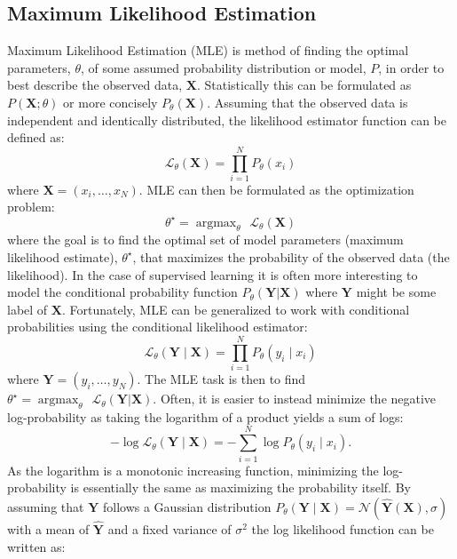 \documentclass[a4paper,11pt]{article} %
\DeclareMathOperator*{\argmax}{argmax} %
\begin{document}
\subsection{Maximum Likelihood Estimation}
Maximum Likelihood Estimation (MLE) is method of finding the optimal parameters, $\theta$, of some assumed probability distribution or model, $P$, in order to best describe the observed data, $\mathbf{X}$. Statistically this can be formulated as $P(\mathbf{X}; \theta)$ or more concisely $P_\theta(\mathbf{X})$. Assuming that the observed data is independent and identically distributed, the likelihood estimator function can be defined as:
\begin{equation}
  \mathcal{L}_\theta(\mathbf{X}) = \prod_{i=1}^{N}{P_\theta(x_i)}
\end{equation} 
where $\mathbf{X} = (x_i, \ldots, x_N)$. MLE can then be formulated as the optimization problem:
\begin{equation}
  \theta^\star = \argmax_{\theta} \hspace{5pt} \mathcal{L}_\theta(\mathbf{X})
\end{equation}
where the goal is to find the optimal set of model parameters (maximum likelihood estimate), $\theta^\star$, that maximizes the probability of the observed data (the likelihood). In the case of supervised learning it is often more interesting to model the conditional probability function $P_\theta(\mathbf{Y} | \mathbf{X})$ where $\mathbf{Y}$ might be some label of $\mathbf{X}$. Fortunately, MLE can be generalized to work with conditional probabilities \cite{Goodfellow-et-al-2016} using the conditional likelihood estimator:
\begin{equation}
  \mathcal{L}_\theta(\mathbf{Y} \mid \mathbf{X}) = \prod_{i=1}^{N}{P_\theta(y_i \mid x_i)}
\end{equation}
where $\mathbf{Y} = (y_i, \ldots, y_N)$. The MLE task is then to find $\theta^\star = \argmax_{\theta} \hspace{5pt} \mathcal{L}_\theta(\mathbf{Y} | \mathbf{X})$. Often, it is easier to instead minimize the negative log-probability as taking the logarithm of a product yields a sum of logs:
\begin{equation} \label{eq:negative-log-likelihood}
  -\log \mathcal{L}_{\theta}(\mathbf{Y} \mid \mathbf{X}) = -\sum_{i=1}^{N} \log P_{\theta}\left(y_{i} \mid x_{i}\right).
\end{equation}
As the logarithm is a monotonic increasing function, minimizing the log-probability is essentially the same as maximizing the probability itself. By assuming that $\mathbf{Y}$ follows a Gaussian distribution $P_{\theta}(\mathbf{Y} \mid \mathbf{X}) = \mathcal{N}(\hat{\mathbf{Y}}(\mathbf{X}), \sigma)$ with a mean of $\hat{\mathbf{Y}}$ and a fixed variance of $\sigma^2$ the log likelihood function can be written as:
\end{document}
